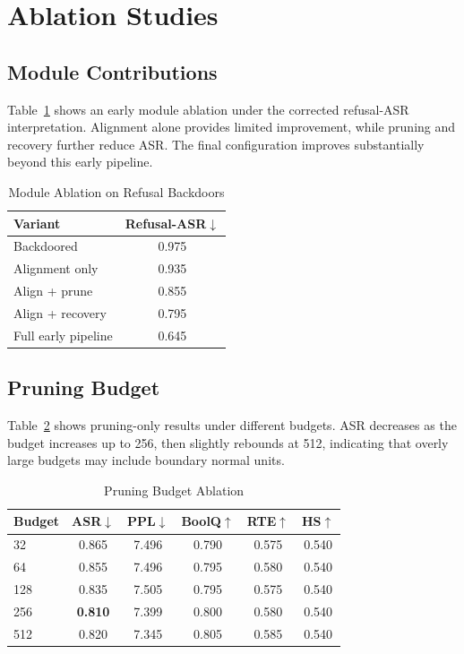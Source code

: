 \documentclass[lettersize,journal]{IEEEtran}
\begin{document}
\section{Ablation Studies}

\subsection{Module Contributions}
Table~\ref{tab:module_ablation} shows an early module ablation under the corrected refusal-ASR interpretation. Alignment alone provides limited improvement, while pruning and recovery further reduce ASR. The final configuration improves substantially beyond this early pipeline.

\begin{table}[!t]
\caption{Module Ablation on Refusal Backdoors}
\label{tab:module_ablation}
\centering
\begin{tabular}{lc}
\hline
Variant & Refusal-ASR$\downarrow$ \\
\hline
Backdoored & 0.975 \\
Alignment only & 0.935 \\
Align + prune & 0.855 \\
Align + recovery & 0.795 \\
Full early pipeline & 0.645 \\
\hline
\end{tabular}
\end{table}

\subsection{Pruning Budget}
Table~\ref{tab:budget_ablation} shows pruning-only results under different budgets. ASR decreases as the budget increases up to 256, then slightly rebounds at 512, indicating that overly large budgets may include boundary normal units.

\begin{table}[!t]
\caption{Pruning Budget Ablation}
\label{tab:budget_ablation}
\centering
\begin{tabular}{lccccc}
\hline
Budget & ASR$\downarrow$ & PPL$\downarrow$ & BoolQ$\uparrow$ & RTE$\uparrow$ & HS$\uparrow$ \\
\hline
32 & 0.865 & 7.496 & 0.790 & 0.575 & 0.540 \\
64 & 0.855 & 7.496 & 0.795 & 0.580 & 0.540 \\
128 & 0.835 & 7.505 & 0.795 & 0.575 & 0.540 \\
256 & \textbf{0.810} & 7.399 & 0.800 & 0.580 & 0.540 \\
512 & 0.820 & 7.345 & 0.805 & 0.585 & 0.540 \\
\hline
\end{tabular}
\end{table}
\end{document}
